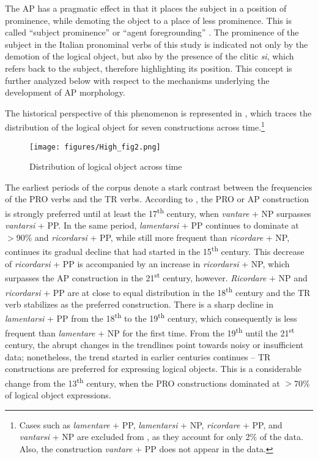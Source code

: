 \documentclass[output=paper,colorlinks,citecolor=brown]{langscibook}
\begin{document}
The AP has a pragmatic effect in that it places the subject in a position of prominence, while demoting the object to a place of less prominence. This is called ``subject prominence” or ``agent foregrounding” \citep[9]{polinsky_13._2017}. The prominence of the subject in the Italian pronominal verbs of this study is indicated not only by the demotion of the logical object, but also by the presence of the clitic \textit{si}, which refers back to the subject, therefore highlighting its position. This concept is further analyzed below with respect to the mechanisms underlying the development of AP morphology.

\hspace*{-2.2pt}The historical perspective of this phenomenon is represented in , which traces the distribution of the logical object for seven constructions across time.\footnote{Cases such as \textit{lamentare} + PP, \textit{lamentarsi} + NP, \textit{ricordare} + PP, and \textit{vantarsi} + NP are excluded from , as they account for only 2\% of the data. Also, the construction \textit{vantare} + PP does not appear in the data.}

\begin{figure}[h]

    \texttt{[image: figures/High\_fig2.png]}
    \caption{Distribution of logical object across time}
    \label{fig:distlobj}
\end{figure}

The earliest periods of the corpus denote a stark contrast between the frequencies of the PRO verbs and the TR verbs. According to , the PRO or AP construction is strongly preferred until at least the 17\textsuperscript{th} century, when \textit{vantare} + NP surpasses \textit{vantarsi} + PP. In the same period, \textit{lamentarsi} + PP continues to dominate at $>$90\% and \textit{ricordarsi} + PP, while still more frequent than \textit{ricordare} + NP, continues its gradual decline that had started in the 15\textsuperscript{th} century. This decrease of \textit{ricordarsi} + PP is accompanied by an increase in \textit{ricordarsi} + NP, which surpasses the AP construction in the 21\textsuperscript{st} century, however. \textit{Ricordare} + NP and \textit{ricordarsi} + PP are at close to equal distribution in the 18\textsuperscript{th} century and the TR verb stabilizes as the preferred construction. There is a sharp decline in \textit{lamentarsi} + PP from the 18\textsuperscript{th} to the 19\textsuperscript{th} century, which consequently is less frequent than \textit{lamentare} + NP for the first time. From the 19\textsuperscript{th} until the 21\textsuperscript{st} century, the abrupt changes in the trendlines point towards noisy or insufficient data; nonetheless, the trend started in earlier centuries continues – TR constructions are preferred for expressing logical objects. This is a considerable change from the 13\textsuperscript{th} century, when the PRO constructions dominated at $>$70\% of logical object expressions.
\end{document}
